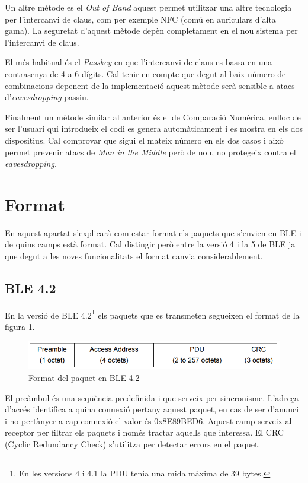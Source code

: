 Un altre mètode es el \textit{Out of Band} aquest permet utilitzar una altre tecnologia per l'intercanvi de claus, com per exemple NFC (comú en auriculars d'alta gama).
La seguretat d'aquest mètode depèn completament en el nou sistema per l'intercanvi de claus.

El més habitual és el \textit{Passkey} en que l'intercanvi de claus es bassa en una contrasenya de 4 a 6 dígits.
Cal tenir en compte que degut al baix número de combinacions depenent de la implementació aquest mètode serà sensible a atacs d'\textit{eavesdropping} passiu.

Finalment un mètode similar al anterior és el de Comparació Numèrica, enlloc de ser l'usuari qui introdueix el codi es genera automàticament i es mostra en els dos dispositius.
Cal comprovar que sigui el mateix número en els dos casos i això permet prevenir atacs de \textit{Man in the Middle} però de nou, no protegeix contra el \textit{eavesdropping}.

\section{Format}
\label{sec:format}
En aquest apartat s'explicarà com estar format els paquets que s'envien en BLE i de quins camps està format.
Cal distingir però entre la versió 4 i la 5 de BLE ja que degut a les noves funcionalitats el format canvia considerablement.

\subsection{BLE 4.2}
En la versió de BLE 4.2\footnote{En les versions 4 i 4.1 la PDU tenia una mida màxima de 39 bytes.} els paquets que es transmeten segueixen el format de la figura \ref{fig:4_2_format}.

\begin{figure}[!h]
	\begin{center}
		\includegraphics[width=1\textwidth]{./images/Packet_format_4_2.png}
		\caption{Format del paquet en BLE 4.2 \cite{BLE_4.2_packet_format}}
		\label{fig:4_2_format}
	\end{center}
\end{figure}

El preàmbul és una seqüència predefinida i que serveix per sincronisme.
L'adreça d'accés identifica a quina connexió pertany aquest paquet, en cas de ser d'anunci i no pertànyer a cap connexió el valor és 0x8E89BED6.
Aquest camp serveix al receptor per filtrar els paquets i només tractar aquells que interessa.
El CRC (Cyclic Redundancy Check) s'utilitza per detectar errors en el paquet. 

